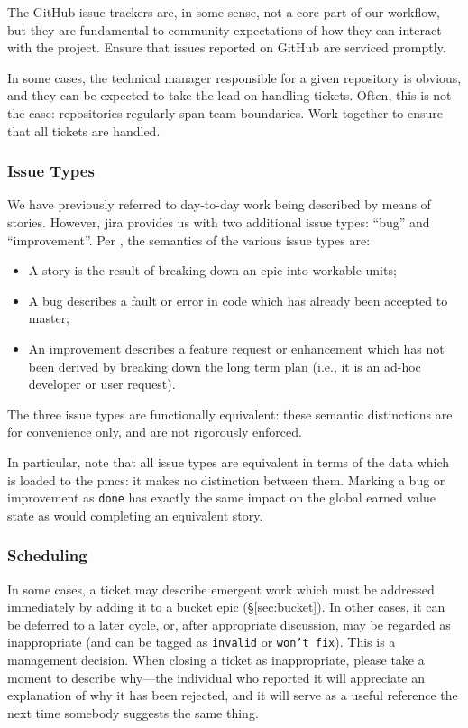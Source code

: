 The GitHub issue trackers are, in some sense, not a core part of our
workflow, but they are fundamental to community expectations of how they
can interact with the project. Ensure that issues reported on GitHub are
serviced promptly.

In some cases, the technical manager responsible for a given repository
is obvious, and they can be expected to take the lead on handling
tickets. Often, this is not the case: repositories regularly span team
boundaries. Work together to ensure that all tickets are handled.

\subsubsection{Issue Types}\label{issue-types}

We have previously referred to day-to-day work being described by means of stories.
However, \gls{jira} provides us with two additional issue types: ``bug'' and ``improvement''.
Per , the semantics of the various issue types are:

\begin{itemize}
\item
  A \gls{story} is the result of breaking down an \gls{epic} into workable units;
\item
  A bug describes a fault or error in code which has already been accepted to master;
\item
  An improvement describes a feature request or enhancement which has not been derived by breaking down the long term plan (i.e., it is an ad-hoc developer or user request).
\end{itemize}

The three issue types are functionally equivalent: these semantic distinctions are for convenience only, and are not rigorously enforced.

In particular, note that all issue types are equivalent in terms of the data which is loaded to the \gls{pmcs}: it makes no distinction between them.
Marking a bug or improvement as \texttt{done} has exactly the same impact on the global earned value state as would completing an equivalent \gls{story}.

\subsubsection{Scheduling}
\label{sec:scheduling}

In some cases, a ticket may describe emergent work which must be addressed immediately by adding it to a bucket \gls{epic} (\S\ref{sec:bucket}).
In other cases, it can be deferred to a later \gls{cycle}, or, after appropriate discussion, may be regarded as inappropriate (and can be tagged as \texttt{invalid} or \texttt{won't fix}).
This is a management decision.
When closing a ticket as inappropriate, please take a moment to describe why---the individual who reported it will appreciate an explanation of why it has been rejected, and it will serve as a useful reference the next time somebody suggests the same thing.


